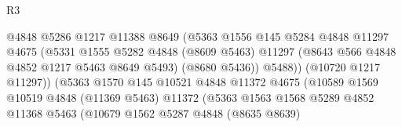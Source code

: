 \begin{lexlean}{R3}
\begin{coremodule}
                                              @4848
                                              @5286
                                              @1217
                                              @11388
                                              @8649
                                              (@5363
                                                @1556
                                                @145
                                                @5284
                                                @4848
                                                @11297
                                                @4675
                                                (@5331
                                                  @1555
                                                  @5282
                                                  @4848
                                                  (@8609 @5463)
                                                  @11297
                                                  (@8643 @566 @4848 @4852 @1217 @5463 @8649 @5493)
                                                  (@8680 @5436))
                                                @5488))
                                            (@10720 @1217 @11297))
                                          (@5363
                                            @1570
                                            @145
                                            @10521
                                            @4848
                                            @11372
                                            @4675
                                            (@10589
                                              @1569
                                              @10519
                                              @4848
                                              (@11369 @5463)
                                              @11372
                                              (@5363
                                                @1563
                                                @1568
                                                @5289
                                                @4852
                                                @11368
                                                @5463
                                                (@10679
                                                  @1562
                                                  @5287
                                                  @4848
                                                  (@8635 @8639)

\end{coremodule}
\end{lexlean}
